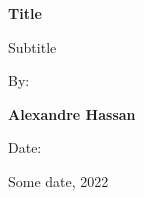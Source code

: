 \begin{titlepage}
    \begin{center}
        \vspace*{1cm}

        {\Large \textbf{Title}}

        \vspace{0.5cm}
        Subtitle

        \vspace{1.5cm}

        By:

        \textbf{Alexandre Hassan}

        \vfill

        Date:

        Some date, 2022

    \end{center}
\end{titlepage}